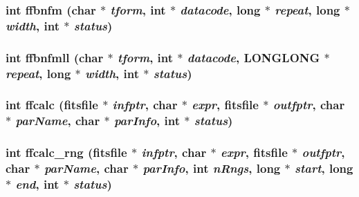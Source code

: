 \subsubsection{\setlength{\rightskip}{0pt plus 5cm}int ffbnfm (char $\ast$ {\em tform}, int $\ast$ {\em datacode}, long $\ast$ {\em repeat}, long $\ast$ {\em width}, int $\ast$ {\em status})}\label{test_2roimasker_2fitsio_8h_cfe4b7969d8e7484d15510380edd2b57}


\subsubsection{\setlength{\rightskip}{0pt plus 5cm}int ffbnfmll (char $\ast$ {\em tform}, int $\ast$ {\em datacode}, \bf{LONGLONG} $\ast$ {\em repeat}, long $\ast$ {\em width}, int $\ast$ {\em status})}\label{test_2roimasker_2fitsio_8h_63407aabf5d249931c496d2b4029a188}


\subsubsection{\setlength{\rightskip}{0pt plus 5cm}int ffcalc (\bf{fitsfile} $\ast$ {\em infptr}, char $\ast$ {\em expr}, \bf{fitsfile} $\ast$ {\em outfptr}, char $\ast$ {\em par\-Name}, char $\ast$ {\em par\-Info}, int $\ast$ {\em status})}\label{test_2roimasker_2fitsio_8h_c546ca394e9c86991b46a6f6c420f7bf}


\subsubsection{\setlength{\rightskip}{0pt plus 5cm}int ffcalc\_\-rng (\bf{fitsfile} $\ast$ {\em infptr}, char $\ast$ {\em expr}, \bf{fitsfile} $\ast$ {\em outfptr}, char $\ast$ {\em par\-Name}, char $\ast$ {\em par\-Info}, int {\em n\-Rngs}, long $\ast$ {\em start}, long $\ast$ {\em end}, int $\ast$ {\em status})}\label{test_2roimasker_2fitsio_8h_fb304389717fe2041f1b59c7acc85249}


